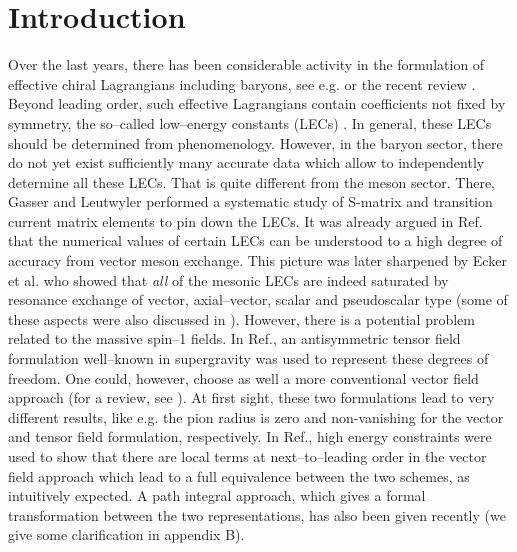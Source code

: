 
\section{Introduction}
Over the last years, there has been considerable activity in the
formulation of effective chiral Lagrangians including baryons, see
e.g. \cite{gss,jm,dobo,bkkm} or the recent review \cite{bkmrev}. Beyond
leading order, such effective Lagrangians contain coefficients not
fixed by symmetry, the so--called low--energy constants (LECs)
\cite{wein79,gl84}. In general, these  LECs should  be determined from
phenomenology. However, in the baryon sector, there do not yet exist
sufficiently many accurate data which allow to independently determine
all these LECs. That is quite different from the meson sector. There,
Gasser and Leutwyler \cite{gl84,gl85} performed a systematic study of
S-matrix  and transition current matrix elements to pin down
the LECs. It was already argued in Ref.\cite{gl84} that the numerical
values of certain LECs can be understood to a high degree of accuracy
from vector meson exchange. This picture was later sharpened by Ecker
et al. \cite{reso,reso1} who showed that {\it all} of the mesonic LECs are
indeed saturated by resonance exchange of vector, axial--vector,
scalar and pseudoscalar type (some of these aspects were also
discussed in \cite{reso2}). However, there is a potential problem
related to the massive spin--1 fields. In Ref.\cite{reso}, an
antisymmetric tensor field formulation well--known in supergravity was
used to represent these degrees of freedom. One could, however, choose
as well a more conventional vector field approach (for a review, see
\cite{ulfpr}).  At first sight, these two formulations lead to
very different results, like e.g. the pion radius is
zero and non-vanishing for the vector and tensor field formulation,
respectively. In Ref.\cite{reso1}, high energy constraints were used
to show that there are local terms at next--to--leading order in the
vector field approach which lead to a full equivalence between the two
schemes, as intuitively expected. A path integral approach, which
gives a formal transformation between the two representations, has also
been given recently \cite{bp} (we give some clarification in appendix B).

